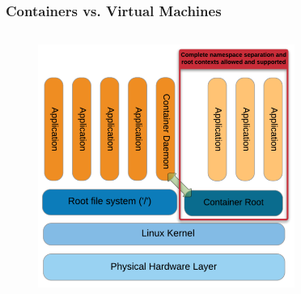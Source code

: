 \documentclass{beamer}
\begin{document}
\begin{frame}
   \frametitle{Containers vs. Virtual Machines}
   \vspace{-4.0em}
   \begin{columns}
      \begin{column}{0.5\textwidth}
         \vspace{5.0em}
         \begin{figure}[htbp]
            \includegraphics[width=0.9\textwidth]{images/singularity-generic-container-architecture.png}
         \end{figure}
      \end{column}
      \hfill
      \begin{column}{0.5\textwidth}
         \begin{figure}[htbp]

\end{figure}
\end{column}
\end{columns}
\end{frame}
\end{document}
